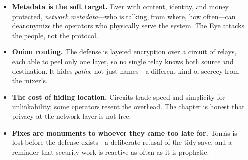 \begin{itemize}
\tightlist
\item
  \textbf{Metadata is the soft target.} Even with content, identity, and money
  protected, \emph{network metadata}---who is talking, from where, how often---can
  deanonymize the operators who physically serve the system. The Eye attacks the
  people, not the protocol.
\item
  \textbf{Onion routing.} The defense is layered encryption over a circuit of
  relays, each able to peel only one layer, so no single relay knows both source
  and destination. It hides \emph{paths}, not just names---a different kind of
  secrecy from the mixer's.
\item
  \textbf{The cost of hiding location.} Circuits trade speed and simplicity for
  unlinkability; some operators resent the overhead. The chapter is honest that
  privacy at the network layer is not free.
\item
  \textbf{Fixes are monuments to whoever they came too late for.} Tomás is lost
  before the defense exists---a deliberate refusal of the tidy save, and a
  reminder that security work is reactive as often as it is prophetic.
\end{itemize}
